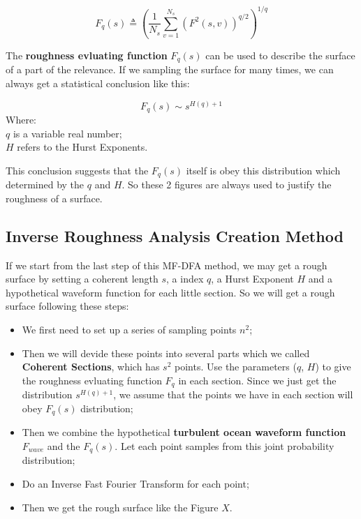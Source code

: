 \documentclass{mcmthesis}
\begin{document}
    \begin{equation}\label{eq:F_q}
      F_q(s) \triangleq (\frac{1}{N_s}\sum_{v=1}^{N_s}(F^2(s,v))^{q/2})^{1/q}
    \end{equation}

    The \textbf{roughness evluating function} $F_q(s)$ can be used to describe the surface of a part of the relevance. If we sampling the surface for many times, we can always get a statistical conclusion like this:

    \begin{equation}\label{eq:F_qq}
      F_q(s) \sim s^{H(q) + 1}
    \end{equation}
    Where:\\
    $q$ is a variable real number;\\
    $H$ refers to the Hurst Exponents.

    This conclusion suggests that the $F_q(s)$ itself is obey this distribution which determined by the $q$ and $H$. So these 2 figures are always used to justify the roughness of a surface.

  \subsection{Inverse Roughness Analysis Creation Method}

    If we start from the last step of this MF-DFA method, we may get a rough surface by setting a coherent length $s$, a index $q$, a Hurst Exponent $H$ and a hypothetical waveform function for each little section. So we will get a rough surface following these steps:

      \begin{itemize}
        \item We first need to set up a series of sampling points $n^2$; \\
        \item Then we will devide these points into several parts which we called \textbf{Coherent Sections}, which has $s^2$ points. Use the parameters ($q$, $H$) to give the roughness evluating function $F_q$ in each section. Since we just get the distribution $s^{H(q) + 1}$, we assume that the points we have in each section will obey $F_q(s)$ distribution; \\
        \item Then we combine the hypothetical \textbf{turbulent ocean waveform function $F_{wave}$ } and the $F_q(s)$. Let each point samples from this joint probability distribution; \\
        \item Do an Inverse Fast Fourier Transform for each point;\\
        \item Then we get the rough surface like the Figure $X$.
      \end{itemize}
\end{document}
